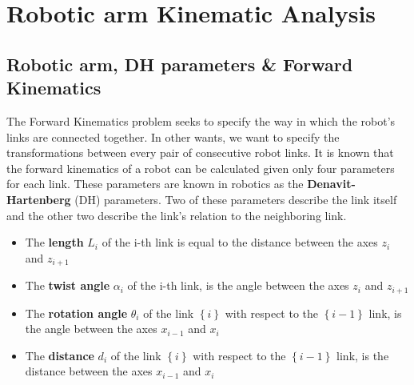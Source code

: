 \chapter{Robotic arm Kinematic Analysis}


\section{Robotic arm, DH parameters \& Forward Kinematics}

The Forward Kinematics problem seeks to specify the way in which the robot's links are connected together. In other wants, we want to specify 
the transformations between every pair of consecutive robot links. It is known that the forward kinematics of a robot can be calculated given only four 
parameters for each link. These parameters are known in robotics as the \textbf{Denavit-Hartenberg} (DH) parameters. Two of these parameters describe the link 
itself and the other two describe the link's relation to the neighboring link.

\begin{itemize}
\item The \textbf{length} $L_i$ of the i-th link is equal to the distance between the axes $z_i$ and $z_{i+1}$
\item The \textbf{twist angle} $α_i$ of the i-th link, is the angle between the axes $z_i$ and $z_{i+1}$
\item The \textbf{rotation angle} $θ_i$ of the link $\left\lbrace i \right\rbrace $ with respect to the $\left\lbrace i-1 \right\rbrace$ link, is the angle 
between the axes $x_{i-1}$ and $x_i$
\item The \textbf{distance} $d_i$ of the link $\left\lbrace i \right\rbrace$ with respect to the $\left\lbrace i-1 \right\rbrace$ link, is the distance 
between the axes $x_{i-1}$ and $x_i$
\end{itemize}


